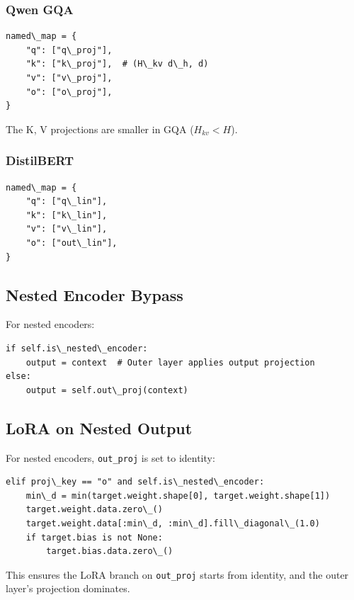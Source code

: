 \subsubsection{Qwen GQA}

\begin{lstlisting}
named\_map = {
    "q": ["q\_proj"],
    "k": ["k\_proj"],  # (H\_kv d\_h, d)
    "v": ["v\_proj"],
    "o": ["o\_proj"],
}
\end{lstlisting}

The K, V projections are smaller in GQA ($H_{kv} < H$).

\subsubsection{DistilBERT}

\begin{lstlisting}
named\_map = {
    "q": ["q\_lin"],
    "k": ["k\_lin"],
    "v": ["v\_lin"],
    "o": ["out\_lin"],
}
\end{lstlisting}

\subsection{Nested Encoder Bypass}

For nested encoders:

\begin{lstlisting}
if self.is\_nested\_encoder:
    output = context  # Outer layer applies output projection
else:
    output = self.out\_proj(context)
\end{lstlisting}

\subsection{LoRA on Nested Output}

For nested encoders, \texttt{out\_proj} is set to identity:

\begin{lstlisting}
elif proj\_key == "o" and self.is\_nested\_encoder:
    min\_d = min(target.weight.shape[0], target.weight.shape[1])
    target.weight.data.zero\_()
    target.weight.data[:min\_d, :min\_d].fill\_diagonal\_(1.0)
    if target.bias is not None:
        target.bias.data.zero\_()
\end{lstlisting}

This ensures the LoRA branch on \texttt{out\_proj} starts from identity, and the 
outer layer's projection dominates.


